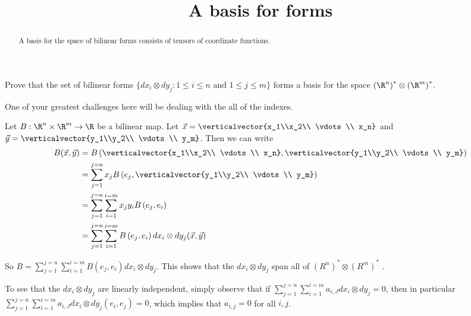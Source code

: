 \documentclass{ximera}
\title{A basis for forms}
\begin{document}
\begin{abstract}
  A basis for the space of bilinear forms consists of tensors of coordinate functions.
\end{abstract}	

Prove that the set of bilinear forms $\{ dx_i \otimes dy_j : 1 \leq i \leq n \text{ and } 1\leq j \leq m\}$ forms a basis for the space 
$\left(\R^n\right)^* \otimes \left(\R^m\right)^*$.

\begin{warning}
  One of your greatest challenges here will be dealing with the all of the indexes.
\end{warning}
	
\begin{free-response}
  Let $B:\R^n \times \R^m \to \R$ be a bilinear map.  Let $\vec{x} = \verticalvector{x_1\\x_2\\ \vdots \\ x_n}$ and 
  $\vec{y} = \verticalvector{y_1\\y_2\\ \vdots \\ y_m}$. Then we can write
  \begin{align*}
    B(\vec{x},\vec{y})&=
    B\left( \verticalvector{x_1\\x_2\\ \vdots \\ x_n}, \verticalvector{y_1\\y_2\\ \vdots \\ y_m}\right) \\
    &= \sum_{j=1}^{j=n} x_jB\left( e_j, \verticalvector{y_1\\y_2\\ \vdots \\ y_m}\right)\\
    &= \sum_{j=1}^{j=n} \sum_{i=1}^{i=m} x_jy_i B\left( e_j , e_i\right)\\
    &= \sum_{j=1}^{j=n} \sum_{i=1}^{i=m} B\left( e_j,e_i\right) dx_i \otimes dy_j(\vec{x},\vec{y})
  \end{align*}
  
  So $B = \sum_{j=1}^{j=n} \sum_{i=1}^{i=m} B\left( e_j,e_i\right) dx_i \otimes dy_j$.  This shows that the $dx_i \otimes dy_j$ span all of 
  $\left(R^n\right)^* \otimes \left(R^m\right)^*$ .
  
  To see that the $dx_i \otimes dy_j$ are linearly independent, simply observe that if 
  $\sum_{j=1}^{j=n} \sum_{i=1}^{i=m} a_{i,J} dx_i \otimes dy_j = 0$, then in particular
  $\sum_{j=1}^{j=n} \sum_{i=1}^{i=m} a_{i,J} dx_i \otimes dy_j (e_i,e_j)= 0$, which implies that
  $a_{i,j} = 0$ for all $i,j$.
\end{free-response}
\end{document}

